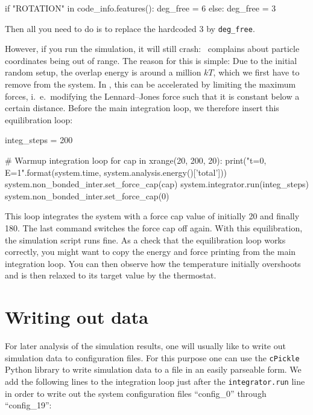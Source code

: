 \documentclass[
a4paper,                        %
11pt,                           %
twoside,                        %
footsepline,                    %
headsepline,                    %
headexclude,                    %
footexclude,                    %
pagesize,                       %
]{scrartcl}
\begin{document}
\begin{tclcode}
if "ROTATION" in code_info.features():
    deg_free = 6
else:
    deg_free = 3
\end{tclcode}

Then all you need to do is to replace the hardcoded 3 by \verb|deg_free|.

However, if you run the simulation, it will still
crash: \es\ complains about particle coordinates being out of range.
The reason for this is simple: Due to the initial random setup, the
overlap energy is around a million $kT$, which we first have to remove
from the system. In \es, this can be accelerated by limiting the maximum
forces, i.~e.\ modifying the Lennard--Jones force such that it is
constant below a certain distance. Before the main integration loop, we
therefore insert this equilibration loop:

\begin{tclcode}
integ_steps = 200

# Warmup integration loop
for cap in xrange(20, 200, 20):
    print("t={0}, E={1}".format(system.time,
                                system.analysis.energy()['total']))
    system.non_bonded_inter.set_force_cap(cap)
    system.integrator.run(integ_steps)
system.non_bonded_inter.set_force_cap(0)
\end{tclcode}

This loop integrates the system with a force cap value of initially 20 and
finally 180.  The last command switches the force cap off again. With
this equilibration, the simulation script runs fine. As a check
that the equilibration loop works correctly, you might want to copy the
energy and force printing from the main integration loop. You can then
observe how the temperature initially overshoots and is then relaxed to
its target value by the thermostat.

\section{Writing out data}

For later analysis of the simulation results, one will
usually like to write out simulation data to configuration files.
For this purpose one can use the \verb|cPickle| Python library to 
write simulation data to a file in an easily parseable form.  We add the 
following lines to the integration loop just after the \verb|integrator.run| line
in order to write out the system configuration files
``config\_0'' through ``config\_19'':
\end{document}
